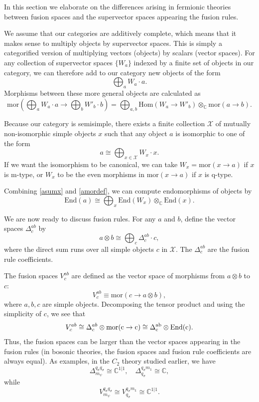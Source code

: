\documentclass[12pt,a4paper]{article}
\newcounter{arrow}
\newcommand{\tp}{\otimes}
\newcommand{\ra}{\rightarrow}
\newcommand{\unit}{\mathds{1}}
\newcommand{\cc}{\mathbb{C}}
\newcommand{\mcx}{\mathcal{X}}
\newcommand\be            {\begin{equation}}
\newcommand\ee            {\end{equation}}
\newcommand{\Hom}{\text{Hom}}
\newcommand{\mor}{\text{mor}}
\newcommand{\End}{\text{End}}
\begin{document}
In this section we elaborate on the differences arising in fermionic theories between fusion spaces and the supervector spaces appearing the fusion rules. 

We assume that our categories are additively complete, which means that it makes sense to
multiply objects by supervector spaces. 
This is simply a categorified version of multiplying vectors (objects) by scalars (vector spaces).
For any collection of supervector spaces $\{W_a\}$ indexed by 
a finite set of objects in our category, 
we can therefore add to our category new objects of the form
\be \bigoplus_a W_a \cdot a.\ee
Morphisms between these more general objects are calculated as  
\be  \label{amordef}
	\mor(\bigoplus_a W_a\cdot a \to \bigoplus_b W'_b\cdot b) = \bigoplus_{a,b} \Hom(W_a \to W'_b)\otimes_\cc \mor(a\to b) .
\ee

Because our category is semisimple, there exists a finite collection $\mcx$ of mutually non-isomorphic simple objects $x$ such
that any object $a$ is isomorphic to one of the form
\be \label{asumx}
	a \cong \bigoplus_{x\in \mcx} W_x\cdot x .
\ee
If we want the isomorphism to be canonical, we can take $W_x = \mor(x\to a)$ if $x$ is m-type, or $W_x$ to be the even morphisms in $\mor(x\to a)$
if $x$ is q-type.

Combining \eqref{asumx} and \eqref{amordef}, we can compute endomorphisms of objects by
\be
	\End(a) \cong \bigoplus_x \End(W_x) \otimes_\cc \End(x).
\ee

We are now ready to discuss fusion rules. 
For any $a$ and $b$, define the vector spaces $\Delta^{ab}_c$ by
\be
	a \otimes b \cong \bigoplus_c \Delta^{ab}_c \cdot c ,
\ee
where the direct sum runs over all simple objects $c$ in $\mcx$. 
The $\Delta^{ab}_c$ are the fusion rule coefficients. 

The fusion spaces $V^{ab}_c$ are defined as the vector space of morphisms from $a\tp b$ to $c$:
\be \label{defn_of_V_by_Delta}
	V^{ab}_c \equiv \mor(c \to a\tp b),
\ee
where $a,b,c$ are simple objects. 
Decomposing the tensor product and using the simplicity of $c$, we see that 
\be V^{ab}_c \cong \Delta^{ab}_c \tp \rm{mor}(c \ra c) \cong \Delta^{ab}_c \otimes \End(c).\ee
Thus, the fusion spaces can be larger than the vector spaces appearing in the fusion rules 
(in bosonic theories, the fusion spaces and fusion rule coefficients are always equal).
As examples, in the $C_2$ theory studied earlier, we have 
\be \Delta^{q_\sigma q_\sigma}_{m_\psi} \cong \cc^{1|1},\quad\Delta^{q_\sigma m_\unit}_{q_\sigma} \cong \cc,\ee
while 
\be V^{q_\sigma q_\sigma}_{m_\psi} \cong V^{q_\sigma m_\unit}_{q_\sigma} \cong \cc^{1|1}.\ee
\end{document}
